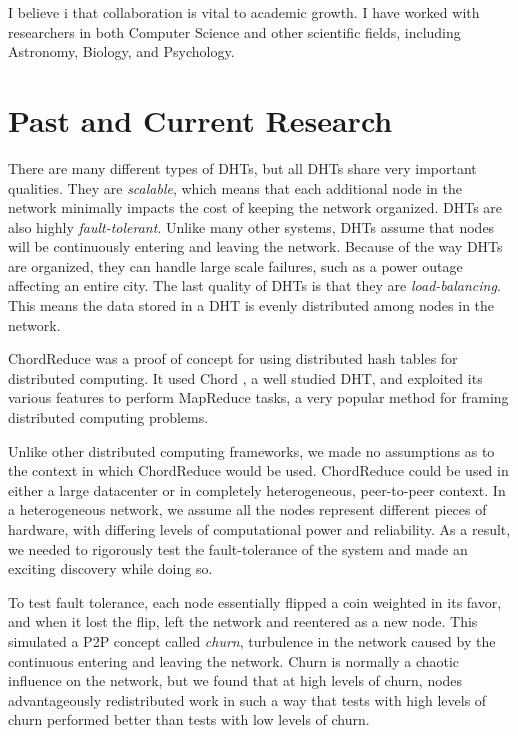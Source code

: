 \documentclass[10pt, a4paper]{article}
\begin{document}
I believe i that collaboration is vital to academic growth.
I have worked with researchers in both Computer Science and other scientific fields, including Astronomy, Biology, and Psychology.





\section{Past and Current Research}

There are many different types of DHTs, but all DHTs share very important qualities.
They are \textit{scalable}, which means that each additional node in the network minimally impacts the cost of keeping the network organized.
DHTs are also highly \textit{fault-tolerant}.
Unlike many other systems, DHTs assume that nodes will be continuously entering and leaving the network.
Because of the way DHTs are organized, they can handle large scale failures, such as a power outage affecting an entire city.
The last quality of DHTs is that they are  \textit{load-balancing}. 
This means the data stored in a DHT is evenly distributed among nodes in the network.


ChordReduce \cite{chordreduce} was a proof of concept for using distributed hash tables for distributed computing.  
It used Chord \cite{chord}, a well studied DHT, and exploited its various features to perform MapReduce \cite{mapreduce} tasks, a very popular method for framing distributed computing problems.

Unlike other distributed computing frameworks, we made no assumptions as to the context in which ChordReduce would be used.
ChordReduce could be used in either a large datacenter or in completely heterogeneous, peer-to-peer context.
In a heterogeneous network, we assume all the nodes represent different pieces of hardware, with differing levels of computational power and reliability.
As a result, we needed to rigorously test the fault-tolerance of the system and made an exciting discovery while doing so.

To test fault tolerance, each node essentially flipped a coin weighted in its favor, and when it lost the flip, left the network and reentered as a new node.
This simulated a P2P concept called \textit{churn}, turbulence in the network caused by the continuous entering and leaving the network.
Churn is normally a chaotic influence on the network, but we found that at high levels of churn, nodes advantageously redistributed work in such a way that tests with high levels of churn performed better than tests with low levels of churn.
\end{document}
